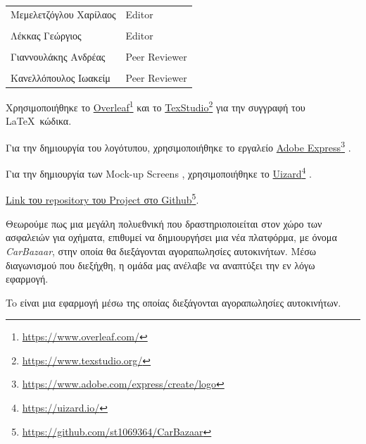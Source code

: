 \documentclass{../ol-softwaremanual}
\newcommand{\doclink}[2]{\href{#1}{#2}\footnote{\url{#1}}}
\begin{document}
	
	\vspace{20pt}
	
	\begin{table}[htbp!]
		\begin{tabular}{ll}
			Μεμελετζόγλου Χαρίλαος & \en Editor \\
			\\ Λέκκας Γεώργιος      &   \en  Editor \\
			\\ Γιαννουλάκης Ανδρέας & \en Peer Reviewer \\
			\\ Κανελλόπουλος Ιωακείμ & \en Peer Reviewer
		\end{tabular}
	\end{table}
	
	
	\vspace{10pt}
	
	
	\vspace{20pt}
	
	Χρησιμοποιήθηκε το \en \doclink{https://www.overleaf.com/}{Overleaf} \gr και το \en \doclink{https://www.texstudio.org/}{TexStudio} \gr για την συγγραφή του \LaTeX\ κώδικα. \break
	
	Για την δημιουργία του λογότυπου, χρησιμοποιήθηκε το εργαλείο \en \doclink{https://www.adobe.com/express/create/logo}{Adobe Express} . \gr \break
	
	Για την δημιουργία των \en Mock-up Screens \gr, χρησιμοποιήθηκε το \en \doclink{https://uizard.io/}{Uizard} \gr . \break
	
\en 	\doclink{https://github.com/st1069364/CarBazaar}{Link \gr του \en  repository \gr του \en Project \gr στο \en Github}. \gr
	
	\newpage
	
	
	\vspace{60pt}
	
	\flushleft
	
	Θεωρούμε πως μια μεγάλη πολυεθνική που δραστηριοποιείται στον χώρο των ασφαλειών για οχήματα, επιθυμεί να δημιουργήσει μια νέα πλατφόρμα, με όνομα  \en \textit{CarBazaar}\gr, στην οποία θα διεξάγονται αγοραπωλησίες αυτοκινήτων. Μέσω διαγωνισμού που διεξήχθη, η ομάδα μας ανέλαβε να αναπτύξει την εν λόγω εφαρμογή. \break
	
	To  \gr είναι μια εφαρμογή μέσω της οποίας διεξάγονται αγοραπωλησίες αυτοκινήτων. \hfill \break
	
\end{document}
